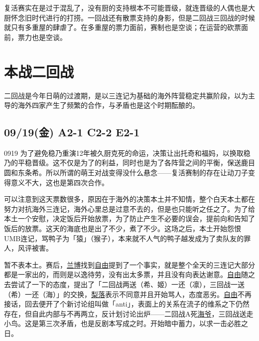 复活赛实在是过于混乱了，没有厨的支持根本不可能晋级，就连晋级的人偶也是大厨怀念旧时代进行的打捞。一回战还有散票支持的身影，但是二回战三回战的时候就只有多重屋的肆虐了。在多重屋的票力面前，赛制也是空谈；在运营的砍票面前，票力也是空谈。

\chapter{本战二回战}

二回战是今年日萌的过渡期，是以三连记为基础的海外阵营稳定共赢阶段，以为主导的海外四家产生了频繁的合作，与矛盾也是这个时期酝酿的。

\section{09/19(金) A2-1 C2-2 E2-1}


0919 为了避免稳乃重演12年被久厨克死的命运，决策让出托奇和福妈，以换取稳乃的平稳晋级。这不仅是为了的利益，同时也是为了各阵营之间的平衡，保送鹿目圆和东条希。所以所谓的萌王对战变得没什么悬念——复活赛制的存在让动刀子变得意义不大，这也是第四次合作。

可以注意到这天票数很多，原因在于海外的决策本土并不知情，整个白天本土都在努力对抗海外三连记，海外心里总是过意不去的，但是也只能听之任之了。为了给本土一个安慰，决定饭后开始放票，为了防止产生不必要的误会，提前向和告知了饭后的放票。这天的海底也是出了不少，煮了不少。这场之后，本土开始怨恨UMB连记，骂鸭子为「猿」（猴子），本来就不人气的鸭子越发成为了卖队友的罪人，风评被害。

暂不表本土。赛后，\uline{兰博}找到\uline{自由}提到了一个事实，就是整个全天的三连记大部分都是一家出的，而则是以逸待劳，没有出太多票，并且没有向表达谢意。\uline{自由}随之去尝试了一下的态度，提出了「二回战两送（希、姬）一还（凛），三回战一送（希）一还（海）」的交换，\uline{梨落}表示不同意并且开始骂人，态度恶劣。\uline{自由}不再接话，回去便开了个新讨论组叫做「anti」，表面上的关系在流子的维系之下仍然存在，但自此内部与不再两立，反计划讨论出炉——二回战A死\uline{海爷}，三回战送走小鸟。这是第三次矛盾，也是反剧本写成之时。开始暗中蓄力，以求一击必胜之日。

